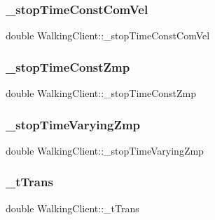 \subsubsection{\texorpdfstring{\+\_\+stop\+Time\+Const\+Com\+Vel}{\_stopTimeConstComVel}}
{\footnotesize\ttfamily double Walking\+Client\+::\+\_\+stop\+Time\+Const\+Com\+Vel\hspace{0.3cm}{\ttfamily [private]}}

\hypertarget{classWalkingClient_a58b08317f6d8b825a21e1db8c7f0ff32}{}\label{classWalkingClient_a58b08317f6d8b825a21e1db8c7f0ff32} 
\subsubsection{\texorpdfstring{\+\_\+stop\+Time\+Const\+Zmp}{\_stopTimeConstZmp}}
{\footnotesize\ttfamily double Walking\+Client\+::\+\_\+stop\+Time\+Const\+Zmp\hspace{0.3cm}{\ttfamily [private]}}

\hypertarget{classWalkingClient_a2ed3837afa0c366f1cdef16b2a99b761}{}\label{classWalkingClient_a2ed3837afa0c366f1cdef16b2a99b761} 
\subsubsection{\texorpdfstring{\+\_\+stop\+Time\+Varying\+Zmp}{\_stopTimeVaryingZmp}}
{\footnotesize\ttfamily double Walking\+Client\+::\+\_\+stop\+Time\+Varying\+Zmp\hspace{0.3cm}{\ttfamily [private]}}

\hypertarget{classWalkingClient_a144518766ec4eb9eeab230fcb291e20c}{}\label{classWalkingClient_a144518766ec4eb9eeab230fcb291e20c} 
\subsubsection{\texorpdfstring{\+\_\+t\+Trans}{\_tTrans}}
{\footnotesize\ttfamily double Walking\+Client\+::\+\_\+t\+Trans\hspace{0.3cm}{\ttfamily [private]}}

